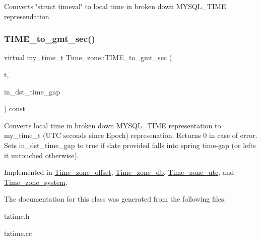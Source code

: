 Comverts \char`\"{}struct timeval\char`\"{} to local time in broken down M\+Y\+S\+Q\+L\+\_\+\+T\+I\+ME represendation. \mbox{\label{classTime__zone_a980bb1d59fe04e899b116169f1b3166d}} 
\subsubsection{\texorpdfstring{T\+I\+M\+E\+\_\+to\+\_\+gmt\+\_\+sec()}{TIME\_to\_gmt\_sec()}}
{\footnotesize\ttfamily virtual my\+\_\+time\+\_\+t Time\+\_\+zone\+::\+T\+I\+M\+E\+\_\+to\+\_\+gmt\+\_\+sec (\begin{DoxyParamCaption}\item[{const M\+Y\+S\+Q\+L\+\_\+\+T\+I\+ME $\ast$}]{t,  }\item[{my\+\_\+bool $\ast$}]{in\+\_\+dst\+\_\+time\+\_\+gap }\end{DoxyParamCaption}) const\hspace{0.3cm}{\ttfamily [pure virtual]}}

Converts local time in broken down M\+Y\+S\+Q\+L\+\_\+\+T\+I\+ME representation to my\+\_\+time\+\_\+t (U\+TC seconds since Epoch) represenation. Returns 0 in case of error. Sets in\+\_\+dst\+\_\+time\+\_\+gap to true if date provided falls into spring time-\/gap (or lefts it untouched otherwise). 

Implemented in \mbox{\hyperlink{classTime__zone__offset_ac37e335674d53e44a91772e755eac709}{Time\+\_\+zone\+\_\+offset}}, \mbox{\hyperlink{classTime__zone__db_afcb398ef9a0ddc1bafc5fd80b2ad9ea4}{Time\+\_\+zone\+\_\+db}}, \mbox{\hyperlink{classTime__zone__utc_afe855f8afb56db1da43edd51b2340ad6}{Time\+\_\+zone\+\_\+utc}}, and \mbox{\hyperlink{classTime__zone__system_ad2a1613d3f1e95410c1191a61fe26749}{Time\+\_\+zone\+\_\+system}}.



The documentation for this class was generated from the following files\+:\begin{DoxyCompactItemize}
\item 
tztime.\+h\item 
tztime.\+cc\end{DoxyCompactItemize}
